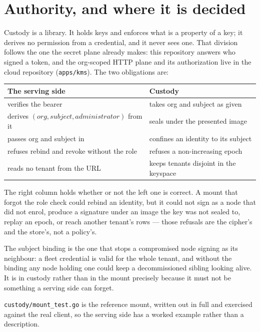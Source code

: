\documentclass[11pt,a4paper]{article}
\newcommand{\code}[1]{\texttt{#1}}
\begin{document}
\section{Authority, and where it is decided}

Custody is a library. It holds keys and enforces what is a property of a key;
it derives no permission from a credential, and it never sees one. That division
follows the one the secret plane already makes: this repository answers who
signed a token, and the org-scoped HTTP plane and its authorization live in the
cloud repository (\code{apps/kms}). The two obligations are:

\begin{center}
\begin{tabular}{ll}
\toprule
\textbf{The serving side} & \textbf{Custody} \\
\midrule
verifies the bearer & takes org and subject as given \\
derives $(\mathit{org}, \mathit{subject}, \mathit{administrator})$ from it & seals under the presented image \\
passes org and subject in & confines an identity to its subject \\
refuses rebind and revoke without the role & refuses a non-increasing epoch \\
reads no tenant from the URL & keeps tenants disjoint in the keyspace \\
\bottomrule
\end{tabular}
\end{center}

The right column holds whether or not the left one is correct. A mount that
forgot the role check could rebind an identity, but it could not sign as a
node that did not enrol, produce a signature under an image the key was not
sealed to, replay an epoch, or reach another tenant's rows --- those refusals
are the cipher's and the store's, not a policy's.

The subject binding is the one that stops a compromised node signing as its
neighbour: a fleet credential is valid for the whole tenant, and without the
binding any node holding one could keep a decommissioned sibling looking alive.
It is in custody rather than in the mount precisely because it must not be
something a serving side can forget.

\code{custody/mount\_test.go} is the reference mount, written out in full and
exercised against the real client, so the serving side has a worked example
rather than a description.
\end{document}
